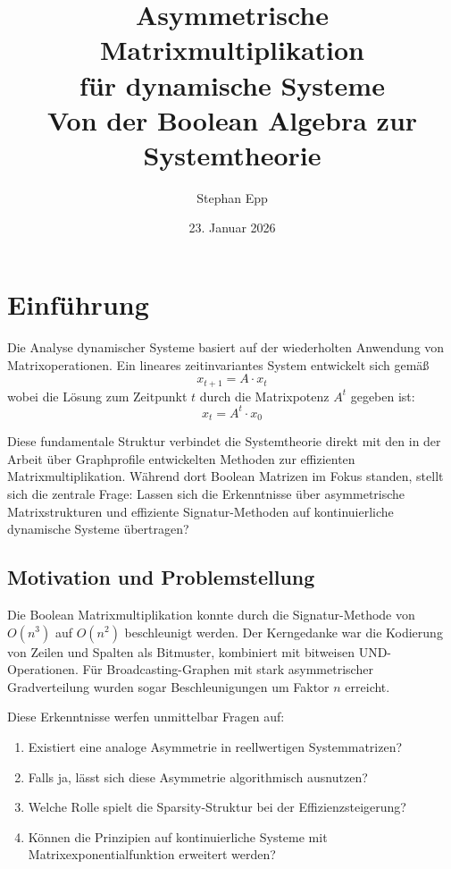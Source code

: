 ﻿\documentclass[a4paper,12pt]{report}
\title{\textbf{Asymmetrische Matrixmultiplikation\\ für dynamische Systeme} \\[0.5ex]\large Von der Boolean Algebra zur Systemtheorie}
\author{Stephan Epp}
\date{23. Januar 2026}
\theoremstyle{definition}
\begin{document}
	
	\maketitle
	\tableofcontents
	\newpage
	
	\chapter{Einführung}
	
	Die Analyse dynamischer Systeme basiert auf der wiederholten Anwendung von Matrixoperationen. Ein lineares zeitinvariantes System entwickelt sich gemäß
	\[
	x_{t+1} = A \cdot x_t
	\]
	wobei die Lösung zum Zeitpunkt $t$ durch die Matrixpotenz $A^t$ gegeben ist:
	\[
	x_t = A^t \cdot x_0
	\]
	
	Diese fundamentale Struktur verbindet die Systemtheorie direkt mit den in der Arbeit über Graphprofile entwickelten Methoden zur effizienten Matrixmultiplikation. Während dort Boolean Matrizen im Fokus standen, stellt sich die zentrale Frage: Lassen sich die Erkenntnisse über asymmetrische Matrixstrukturen und effiziente Signatur-Methoden auf kontinuierliche dynamische Systeme übertragen?
	
	\section{Motivation und Problemstellung}
	
	Die Boolean Matrixmultiplikation konnte durch die Signatur-Methode von $O(n^3)$ auf $O(n^2)$ beschleunigt werden. Der Kerngedanke war die Kodierung von Zeilen und Spalten als Bitmuster, kombiniert mit bitweisen UND-Operationen. Für Broadcasting-Graphen mit stark asymmetrischer Gradverteilung wurden sogar Beschleunigungen um Faktor $n$ erreicht.
	
	Diese Erkenntnisse werfen unmittelbar Fragen auf:
	
	\begin{enumerate}
		\item Existiert eine analoge Asymmetrie in reellwertigen Systemmatrizen?
		\item Falls ja, lässt sich diese Asymmetrie algorithmisch ausnutzen?
		\item Welche Rolle spielt die Sparsity-Struktur bei der Effizienzsteigerung?
		\item Können die Prinzipien auf kontinuierliche Systeme mit Matrixexponentialfunktion erweitert werden?
	\end{enumerate}
	
\end{document}
